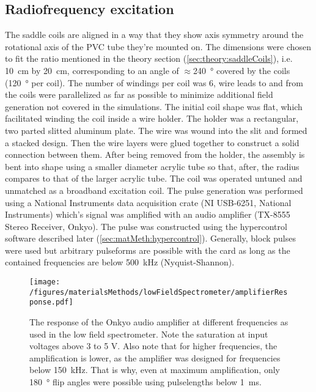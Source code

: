         \subsection{Radiofrequency excitation}
        \label{sec:matMeth:rfPulses}
        The saddle coils are aligned in a way that they show axis symmetry around the rotational axis of the PVC tube they're mounted on. The dimensions were chosen to fit the ratio mentioned in the theory section (\ref{sec:theory:saddleCoils}), i.e. \SI{10}{\cm} by \SI{20}{\cm}, corresponding to an angle of $\approx$\SI{240}{\degree} covered by the coils (\SI{120}{\degree} per coil). The number of windings per coil was 6, wire leads to and from the coils were parallelized as far as possible to minimize additional field generation not covered in the simulations. 
        The initial coil shape was flat, which facilitated winding the coil inside a wire holder. The holder was a rectangular, two parted slitted aluminum plate. The wire was wound into the slit and formed a stacked design. Then the wire layers were glued together to construct a solid connection between them. After being removed from the holder, the assembly is bent into shape using a smaller diameter acrylic tube so that, after, the radius compares to that of the larger acrylic tube. The coil was operated untuned and unmatched as a broadband excitation coil. The pulse generation was performed using a National Instruments data acquisition crate (NI USB-6251, National Instruments) which's signal was amplified with an audio amplifier (TX-8555 Stereo Receiver, Onkyo).
            The pulse was constructed using the hypercontrol software described later (\ref{sec:matMeth:hypercontrol}). Generally, block pulses were used but arbitrary pulseforms are possible with the card as long as the contained frequencies are below \SI{500}{\kilo\hertz} (Nyquist-Shannon). 
            \begin{figure}
                \label{fig:matMeth:amplifierResponse}
                \centering
                \texttt{[image: /figures/materialsMethods/lowFieldSpectrometer/amplifierResponse.pdf]}
            \caption[Amplifier response]{The response of the Onkyo audio amplifier at different frequencies as used in the low field spectrometer. Note the saturation at input voltages above 3 to 5 \si{\volt}. Also note that for higher frequencies, the amplification is lower, as the amplifier was designed for frequencies below \SI{150}{\kilo\hertz}. That is why, even at maximum amplification, only \SI{180}{\degree} flip angles were possible using pulselengths below \SI{1}{\milli\second}.}
            \end{figure}
